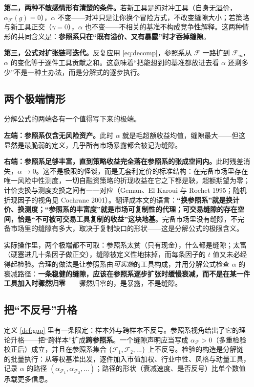 \textbf{第二，两种不敏感情形有清楚的条件。}若新工具是纯对冲工具（自身无溢价，$\alpha_{\mathcal{F}}(g)=0$），$\alpha$ 不变——对冲只是让你换个冒险方式，不改变缝隙大小；若策略与新工具正交（$\gamma=0$），$\alpha$ 也不变——不相关的基准不构成竞争性解释。这两种情形的共同含义是：\textbf{参照系只在“既有溢价、又有暴露”时才吞掉缝隙}。

\textbf{第三，公式对扩张链可迭代。}反复应用 \eqref{eq:decomp}，参照系从 $\mathcal{F}$ 一路扩到 $\mathcal{F}_m$，$\alpha$ 的变化等于逐件工具贡献之和。这意味着“把能想到的基准都放进去看 $\alpha$ 还剩多少”不是一种土办法，而是分解式的逐步执行。

\subsection{两个极端情形}

分解公式的两端各有一个值得写下来的极端。

\textbf{左端：参照系仅含无风险资产。}此时 $\alpha$ 就是毛超额收益均值，缝隙最大——但这显然是最脆弱的定义，几乎所有市场暴露都会被记为缝隙。

\textbf{右端：参照系足够丰富，直到策略收益完全落在参照系的张成空间内。}此时残差消失，$\alpha\to 0$。这不是极限的怪谈，而是无套利定价的标准结构：在完备市场里存在唯一风险中性测度，一切自融资策略的折现收益在它之下都是鞅，超额期望为零；计价变换与测度变换之间有一一对应（Geman、El Karoui 与 Rochet 1995\cite{geman1995}；随机折现因子的视角见 Cochrane 2001\cite{cochrane2001}）。翻译成本文的语言：\textbf{“换参照系”就是换计价、换测度；“参照系的丰富度”就是市场可复制性的代理；可交易缝隙的存在空间，恰是“不可被可交易工具复制的收益”这块地基}。完备市场里没有缝隙，不完备市场里的缝隙有多大，取决于复制缺口的形状——这是分解公式的极限含义。

实际操作里，两个极端都不可取：参照系太贫（只有现金），什么都是缝隙；太富（硬塞进几十条因子做正交），缝隙被定义性地抹掉，而每条因子的 $t$ 值又未必经得起检验。合理的做法是让参照系由\emph{可实施}的工具构成，并用分解公式检查 $\alpha$ 的衰减路径：\textbf{一条稳健的缝隙，应该在参照系逐步扩张时缓慢衰减，而不是在某一件工具加入时骤然归零}——骤然归零的，是暴露，不是缝隙。

\subsection{把“不反号”升格}

定义 \ref{def:gap} 里有一条限定：样本外与跨样本不反号。参照系视角给出了它的理论升格——把“跨样本”扩成\textbf{跨参照系}。一个缝隙声明应当写成 $\alpha_{\mathcal{F}}>0$（多重检验校正后）成立，并且在参照系集合 $\{\mathcal{F}_1,\mathcal{F}_2,\dots\}$ 上不反号。检验的构造是分解链的批量执行：从等权基准出发，逐件加入市值加权、行业中性、风格与动量工具，记录 $\alpha$ 的路径 $(\alpha_{\mathcal{F}_1},\alpha_{\mathcal{F}_2},\dots)$；路径的形状（衰减速度、是否反号）比单个数值承载更多信息。

